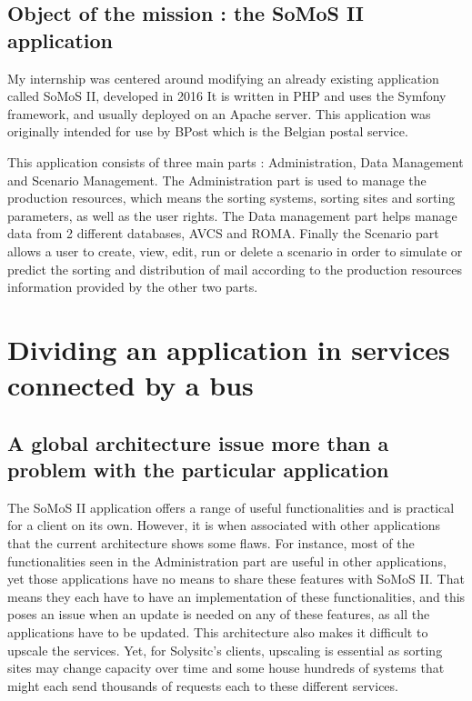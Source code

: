 \documentclass[12pt,a4paper,twoside]{article}
\begin{document}
\subsection{Object of the mission : the SoMoS II application}

My internship was centered around modifying an already existing application called SoMoS II, developed in 2016 It is written in PHP and uses the Symfony framework, and usually deployed on an Apache server. This application was originally intended for use by BPost which is the Belgian postal service.

This application consists of three main parts : Administration, Data Management and Scenario Management. The Administration part is used to manage the production resources, which means the sorting systems, sorting sites and sorting parameters, as well as the user rights. The Data management part helps manage data from 2 different databases, AVCS and ROMA. Finally the Scenario part allows a user to create, view, edit, run or delete a scenario in order to simulate or predict the sorting and distribution of mail according to the production resources information provided by the other two parts.

\section{Dividing an application in services connected by a bus}
\subsection{A global architecture issue more than a problem with the particular application}
The SoMoS II application offers a range of useful functionalities and is practical for a client on its own. However, it is when associated with other applications that the current architecture shows some flaws. For instance, most of the functionalities seen in the Administration part are useful in other applications, yet those applications have no means to share these features with SoMoS II. That means they each have to have an implementation of these functionalities, and this poses an issue when an update is needed on any of these features, as all the applications have to be updated. This architecture also makes it difficult to upscale the services. Yet, for Solysitc's clients, upscaling is essential as sorting sites may change capacity over time and some house hundreds of systems that might each send thousands of requests each to these different services.
\end{document}
